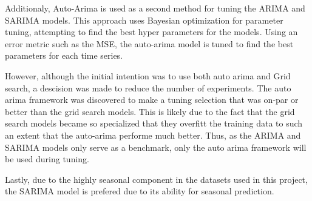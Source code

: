 Additionaly, Auto-Arima is used as a second method for tuning the ARIMA and SARIMA models.
This approach uses Bayesian optimization for parameter tuning, attempting to find the best hyper parameters for the models.
Using an error metric such as the MSE, the auto-arima model is tuned to find the best parameters for each time series.

However, although the initial intention was to use both auto arima and Grid search, a descision was made to reduce the number of experiments.
The auto arima framework was discovered to make a tuning selection that was on-par or better than the grid search models.
This is likely due to the fact that the grid search models became so specialized that they overfitt the training data to such an extent that the auto-arima performe much better.
Thus, as the ARIMA and SARIMA models only serve as a benchmark, only the auto arima framework will be used during tuning.

Lastly, due to the highly seasonal component in the datasets used in this project,
the SARIMA model is prefered due to its ability for seasonal prediction.
